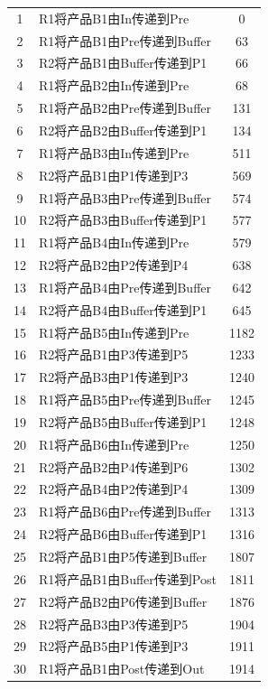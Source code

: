 \documentclass{ctexart}
\begin{document}
{{\begin{longtable}{clc}
        1 & R1将产品B1由In传递到Pre & 0 \\
        2 & R1将产品B1由Pre传递到Buffer & 63 \\
        3 & R2将产品B1由Buffer传递到P1 & 66 \\
        4 & R1将产品B2由In传递到Pre & 68 \\
        5 & R1将产品B2由Pre传递到Buffer & 131 \\
        6 & R2将产品B2由Buffer传递到P1 & 134 \\
        7 & R1将产品B3由In传递到Pre & 511 \\
        8 & R2将产品B1由P1传递到P3 & 569 \\
        9 & R1将产品B3由Pre传递到Buffer & 574 \\
        10 & R2将产品B3由Buffer传递到P1 & 577 \\
        11 & R1将产品B4由In传递到Pre & 579 \\
        12 & R2将产品B2由P2传递到P4 & 638 \\
        13 & R1将产品B4由Pre传递到Buffer & 642 \\
        14 & R2将产品B4由Buffer传递到P1 & 645 \\
        15 & R1将产品B5由In传递到Pre & 1182 \\
        16 & R2将产品B1由P3传递到P5 & 1233 \\
        17 & R2将产品B3由P1传递到P3 & 1240 \\
        18 & R1将产品B5由Pre传递到Buffer & 1245 \\
        19 & R2将产品B5由Buffer传递到P1 & 1248 \\
        20 & R1将产品B6由In传递到Pre & 1250 \\
        21 & R2将产品B2由P4传递到P6 & 1302 \\
        22 & R2将产品B4由P2传递到P4 & 1309 \\
        23 & R1将产品B6由Pre传递到Buffer & 1313 \\
        24 & R2将产品B6由Buffer传递到P1 & 1316 \\
        25 & R2将产品B1由P5传递到Buffer & 1807 \\
        26 & R1将产品B1由Buffer传递到Post & 1811 \\
        27 & R2将产品B2由P6传递到Buffer & 1876 \\
        28 & R2将产品B3由P3传递到P5 & 1904 \\
        29 & R2将产品B5由P1传递到P3 & 1911 \\
        30 & R1将产品B1由Post传递到Out & 1914 \\

\end{longtable}}}
\end{document}
